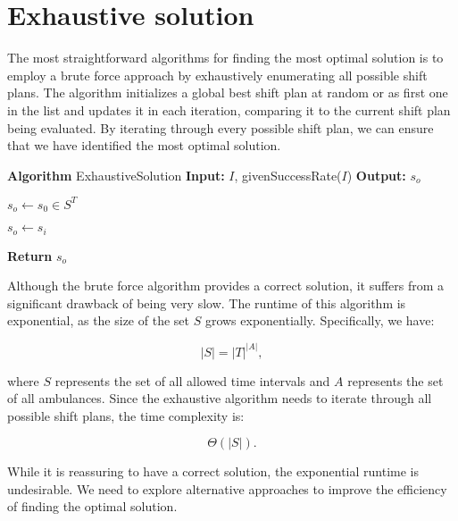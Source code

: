 \newpage

\section{Exhaustive solution}

The most straightforward algorithms for finding the most optimal solution is to
employ a brute force approach by exhaustively enumerating all possible shift
plans. The algorithm initializes a global best shift plan at random or as first
one in the list and updates it in each iteration, comparing it to the current
shift plan being evaluated. By iterating through every possible shift plan, we
can ensure that we have identified the most optimal solution.

\begin{algorithmic}
    \STATE \textbf{Algorithm} ExhaustiveSolution
    \STATE \textbf{Input:} $I$, givenSuccessRate($I$)
    \STATE \textbf{Output:} $s_o$

    \STATE $s_o \leftarrow s_0 \in S^T$

    \STATE $s_o \leftarrow s_i$
    \ENDIF
    \ENDFOR

    \STATE \textbf{Return} $s_o$
\end{algorithmic}

Although the brute force algorithm provides a correct solution, it suffers from
a significant drawback of being very slow. The runtime of this algorithm is
exponential, as the size of the set $S$ grows exponentially. Specifically, we
have:

\[
    |S| = |T|^{|A|},
\]

where $S$ represents the set of all allowed time intervals and $A$ represents
the set of all ambulances. Since the exhaustive algorithm needs to iterate
through all possible shift plans, the time complexity is:

\[
    \Theta(|S|).
\]

While it is reassuring to have a correct solution, the exponential runtime is
undesirable. We need to explore alternative approaches to improve the
efficiency of finding the optimal solution.